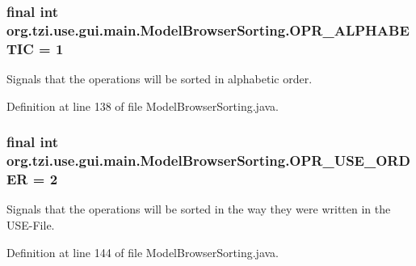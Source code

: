 \hypertarget{classorg_1_1tzi_1_1use_1_1gui_1_1main_1_1_model_browser_sorting_ac8d1d2a1d2e05a00f44b44b50c7b183d}{
\subsubsection[{O\-P\-R\-\_\-\-A\-L\-P\-H\-A\-B\-E\-T\-I\-C}]{\setlength{\rightskip}{0pt plus 5cm}final int org.\-tzi.\-use.\-gui.\-main.\-Model\-Browser\-Sorting.\-O\-P\-R\-\_\-\-A\-L\-P\-H\-A\-B\-E\-T\-I\-C = 1\hspace{0.3cm}{\ttfamily [static]}}}\label{classorg_1_1tzi_1_1use_1_1gui_1_1main_1_1_model_browser_sorting_ac8d1d2a1d2e05a00f44b44b50c7b183d}
Signals that the operations will be sorted in alphabetic order. 

Definition at line 138 of file Model\-Browser\-Sorting.\-java.

\hypertarget{classorg_1_1tzi_1_1use_1_1gui_1_1main_1_1_model_browser_sorting_afef24285ba4c614f9eced7fc91e01cb0}{
\subsubsection[{O\-P\-R\-\_\-\-U\-S\-E\-\_\-\-O\-R\-D\-E\-R}]{\setlength{\rightskip}{0pt plus 5cm}final int org.\-tzi.\-use.\-gui.\-main.\-Model\-Browser\-Sorting.\-O\-P\-R\-\_\-\-U\-S\-E\-\_\-\-O\-R\-D\-E\-R = 2\hspace{0.3cm}{\ttfamily [static]}}}\label{classorg_1_1tzi_1_1use_1_1gui_1_1main_1_1_model_browser_sorting_afef24285ba4c614f9eced7fc91e01cb0}
Signals that the operations will be sorted in the way they were written in the U\-S\-E-\/\-File. 

Definition at line 144 of file Model\-Browser\-Sorting.\-java.

